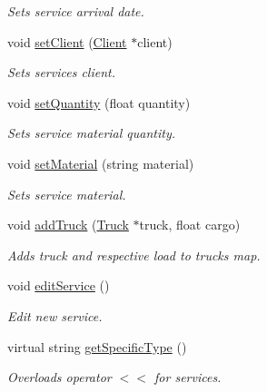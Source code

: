 \begin{DoxyCompactItemize}
\begin{DoxyCompactList}\small\item\em Sets service arrival date. \end{DoxyCompactList}\item 
void \hyperlink{class_service_a1cf3d0b85e44bd7ec58e4a12a7432aef}{set\+Client} (\hyperlink{class_client}{Client} $\ast$client)
\begin{DoxyCompactList}\small\item\em Sets service\textquotesingle{}s client. \end{DoxyCompactList}\item 
void \hyperlink{class_service_a29386f4e82e1de1f654468d4a020c6a4}{set\+Quantity} (float quantity)
\begin{DoxyCompactList}\small\item\em Sets service material quantity. \end{DoxyCompactList}\item 
void \hyperlink{class_service_a9fcafc3bcbdc0b436860ee5626c69ce1}{set\+Material} (string material)
\begin{DoxyCompactList}\small\item\em Sets service material. \end{DoxyCompactList}\item 
void \hyperlink{class_service_a9812c174aa203cb9e7b9f758b1815ac4}{add\+Truck} (\hyperlink{class_truck}{Truck} $\ast$truck, float cargo)
\begin{DoxyCompactList}\small\item\em Adds truck and respective load to trucks map. \end{DoxyCompactList}\item 
void \hyperlink{class_service_a351a27eebc07d1ff3f433d6ad356925a}{edit\+Service} ()
\begin{DoxyCompactList}\small\item\em Edit new service. \end{DoxyCompactList}\item 
virtual string \hyperlink{class_service_a4e833f8d8688facfe0858eb4299660e8}{get\+Specific\+Type} ()
\begin{DoxyCompactList}\small\item\em Overloads operator $<$$<$ for services. \end{DoxyCompactList}\end{DoxyCompactItemize}
